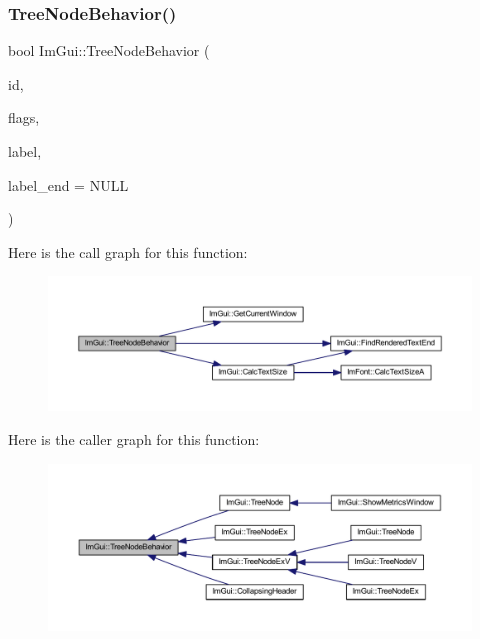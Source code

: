 \subsubsection{\texorpdfstring{Tree\+Node\+Behavior()}{TreeNodeBehavior()}}
{\footnotesize\ttfamily bool Im\+Gui\+::\+Tree\+Node\+Behavior (\begin{DoxyParamCaption}\item[{\mbox{\hyperlink{imgui_8h_a1785c9b6f4e16406764a85f32582236f}{Im\+Gui\+ID}}}]{id,  }\item[{\mbox{\hyperlink{imgui_8h_a0588fdd10c59b49a0159484fe9ec4564}{Im\+Gui\+Tree\+Node\+Flags}}}]{flags,  }\item[{const char $\ast$}]{label,  }\item[{const char $\ast$}]{label\+\_\+end = {\ttfamily NULL} }\end{DoxyParamCaption})}

Here is the call graph for this function\+:
\nopagebreak
\begin{figure}[H]
\begin{center}
\leavevmode
\includegraphics[width=350pt]{namespace_im_gui_a918eabf70d288e93b2519ee1eac2c0b4_cgraph}
\end{center}
\end{figure}
Here is the caller graph for this function\+:
\nopagebreak
\begin{figure}[H]
\begin{center}
\leavevmode
\includegraphics[width=350pt]{namespace_im_gui_a918eabf70d288e93b2519ee1eac2c0b4_icgraph}
\end{center}
\end{figure}
\mbox{\label{namespace_im_gui_a22cc50485aad6da8a3a4e156b500ed4a}} 
